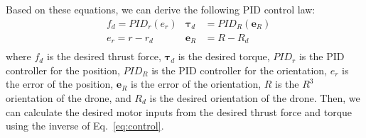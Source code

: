 Based on these equations, we can derive the following PID control law:
\begin{equation}
  \begin{aligned}
    &f_d = {PID}_r(e_r)
    &\bm{\tau}_d &= {PID}_R(\bm{e}_R)\\
    &e_r = r - r_d
    &\bm{e}_R &= R - R_d\\
  \end{aligned}
\end{equation}
where $f_d$ is the desired thrust force, 
$\bm{\tau}_d$ is the desired torque, 
$PID_r$ is the PID controller for the position, 
$PID_R$ is the PID controller for the orientation, 
$e_r$ is the error of the position, 
$\bm{e}_R$ is the error of the orientation, 
$R$ is the $R^3$ orientation of the drone, 
and $R_d$ is the desired orientation of the drone.
Then, we can calculate the desired motor inputs from the desired thrust force and torque using the inverse of Eq.~\ref{eq:control}.